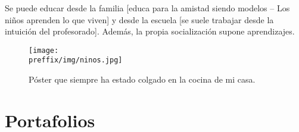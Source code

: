 \documentclass[palatino]{apuntesURJC}
\newcommand{\preffix}{.}
\begin{document}
Se puede educar desde la familia [educa para la amistad siendo modelos -- Los niños aprenden lo que viven]  y desde la escuela [se suele trabajar desde la intuición del profesorado].
%
Además, la propia socialización supone aprendizajes.


\begin{figure}[hbtp]
\centering
\caption{Póster que siempre ha estado colgado en la cocina de mi casa.}
\label{img:ninos}
\texttt{[image: \\preffix/img/ninos.jpg]}
\end{figure}


\appendix



\chapter{Portafolios}



\printindex
\end{document}
